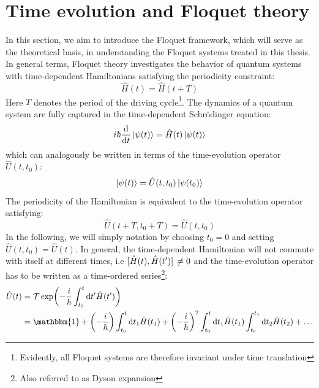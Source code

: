 \documentclass[11pt, a4paper, oneside]{book}
\theoremstyle{definition} %
\begin{document}


%	

  
\section{Time evolution and Floquet theory}
In this section, we aim to introduce the Floquet framework, which will serve as the theoretical basis, in understanding the Floquet systems treated in this thesis. In general terms, Floquet theory investigates the behavior of quantum systems with time-dependent Hamiltonians satisfying the periodicity constraint: 
	\begin{equation}
		\hat{H}(t) = \hat{H}(t+ T)
	\end{equation}
Here $T$ denotes the period of the driving cycle\footnote{Evidently, all Floquet systems are therefore invariant under time translation}. The dynamics of a quantum system are fully captured in the time-dependent Schrödinger equation:
	\begin{equation}
		i\hbar \dv{t} \ket{\psi(t)} = \hat{H}(t) \ket{\psi(t)}
	\end{equation}
which can analogously be written in terms of the time-evolution operator $\hat{U}(t,t_0)$:
	\begin{equation}
		\ket{\psi(t)} = \hat{U}(t,t_0) \ket{\psi(t_0)}
	\end{equation}
The periodicity of the Hamiltonian is equivalent to the time-evolution operator satisfying:
\begin{equation}
	\hat{U}(t + T, t_0 + T) = \hat{U}(t, t_0)
\end{equation}
In the following, we will simply notation by choosing $t_0 = 0$ and setting $\hat{U}(t, t_0) = \hat{U}(t)$. In general, the time-dependent Hamiltonian will not commute with itself at different times, i.e  $\comm*{\hat{H}(t)}{\hat{H}(t')} \neq 0$ and the time-evolution operator has to be written as a time-ordered series\footnote{Also referred to as Dyson expansion}:
	\begin{equation}
	\begin{split}	
	\hat{U}(t) &= \mathcal{T} \exp(	-\frac{i}{\hbar} \int_{t_0}^t \dd t' \hat{H}(t'))\\
	&= \mathbbm{1} + \left(- \frac{i}{\hbar}\right) \int_{t_0}^t \dd t_1 \hat{H}(t_1) + \left(-\frac{i}{\hbar}\right)^2 \int_{t_0}^t \dd t_1 \hat{H}(t_1) \int_{t_0}^{t_1} \dd t_2 \hat{H}(t_2) + \dots
	\end{split}
	\label{eq:time_evolution_operator}
	\end{equation}
\end{document}
